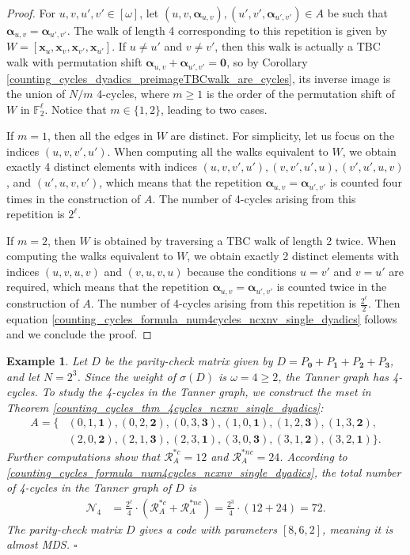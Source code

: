 \documentclass[11pt]{article}
\theoremstyle{plain}
\theoremstyle{plain}
\newtheorem{PreExample}[lemma]{{\textbf{Example}}}
\newenvironment{example}%
    {\begin{PreExample}\upshape}{\hfill$\square$\end{PreExample}}
\theoremstyle{definition}
\numberwithin{theo}{section}
\newcommand{\bzero}{\mathbf{0}}
\newcommand{\bx}{{\mathbf x}}
\newcommand{\balpha}{{\boldsymbol \alpha}}
\newcounter{alp}
\newcounter{ara}
\newcounter{rom}
\begin{document}
\begin{proof}
For $u,v,u',v'\in[\omega]$, let $(u,v,\balpha_{u,v}),(u',v',\balpha_{u',v'})\in A$ be such that $\balpha_{u,v}=\balpha_{u',v'}$. The walk of length 4 corresponding to this repetition is given by $W=[\bx_u,\bx_v,\bx_{v'},\bx_{u'}]$. If $u\neq u'$ and $v\neq v'$, then this walk is actually a TBC walk with permutation shift $\balpha_{u,v}+\balpha_{u',v'}=\bzero$, so by Corollary \ref{counting_cycles_dyadics_preimageTBCwalk_are_cycles}, its inverse image is the union of $N/m$ 4-cycles, where $m\geq 1$ is the order of the permutation shift of $W$ in $\mathbb{F}_2^\ell$. Notice that $m\in\{1,2\}$, leading to two cases. 

If $m=1$, then all the edges in $W$ are distinct. For simplicity, let us focus on the indices $(u,v,v',u')$. When computing all the walks equivalent to $W$, we obtain exactly 4 distinct elements with indices $(u,v,v',u'),(v,v',u',u),(v',u',u,v)$, and $(u',u,v,v')$, which means that the repetition $\balpha_{u,v}=\balpha_{u',v'}$ is counted four times in the construction of $A$. The number of 4-cycles arising from this repetition is $2^\ell$. 

If $m=2$, then $W$ is obtained by traversing a TBC walk of length 2 twice. When computing the walks equivalent to $W$, we obtain exactly 2 distinct elements with indices $(u,v,u,v)$ and $(v,u,v,u)$ because the conditions $u=v'$ and $v=u'$ are required, which means that the repetition $\balpha_{u,v}=\balpha_{u',v'}$ is counted twice in the construction of $A$. The number of 4-cycles arising from this repetition is $\frac{2^\ell}{2}$. Then equation \eqref{counting_cycles_formula_num4cycles_ncxnv_single_dyadics} follows and we conclude the proof. 
\end{proof}

\begin{example}
\label{counting_cycles_example_4cycles_g4_single_dyadics}
Let $D$ be the parity-check matrix given by $D=P_{\boldsymbol0}+P_{\boldsymbol1}+P_{\boldsymbol2}+P_{\boldsymbol3}$, and let $N=2^3$. Since the weight of $\sigma(D)$ is $\omega=4\geq2$, the Tanner graph has 4-cycles. To study the 4-cycles in the Tanner graph, we construct the mset in Theorem \ref{counting_cycles_thm_4cycles_ncxnv_single_dyadics}:  
\begin{align*}
A=\{&(0, 1, \mathbf{1}), (0, 2, \mathbf{2}), (0, 3, \mathbf{3}), (1, 0, \mathbf{1}), (1, 2, \mathbf{3}), (1, 3, \mathbf{2}), \\ & (2, 0, \mathbf{2}), (2, 1, \mathbf{3}), (2, 3, \mathbf{1}), (3, 0, \mathbf{3}), (3, 1, \mathbf{2}), (3, 2, \mathbf{1})\}.
\end{align*}
Further computations show that $\mathcal{R}_{A}^{*c}=12$ and $\mathcal{R}_{A}^{*nc}=24$. According to \eqref{counting_cycles_formula_num4cycles_ncxnv_single_dyadics}, the total number of 4-cycles in the Tanner graph of $D$ is
\begin{align*}
\mathcal{N}_4 &= \frac{2^\ell}{4}\cdot\left(\mathcal{R}_{A}^{*c}+\mathcal{R}_{A}^{*nc}\right) = \frac{2^3}{4}\cdot\left(12+24\right) = 72.
\end{align*}
The parity-check matrix $D$ gives a code with parameters $[8,6,2]$, meaning it is almost MDS.
\end{example}
\end{document}
